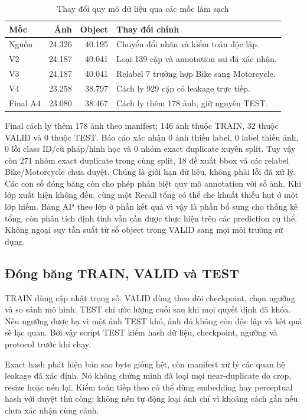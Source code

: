\documentclass[12pt,a4paper,oneside]{report}
\begin{document}
\begin{table}[H]\centering
\caption{Thay đổi quy mô dữ liệu qua các mốc làm sạch}\label{tab:cleaning}
\begin{tabular}{lrrp{6.1cm}}\toprule
Mốc & Ảnh & Object & Thay đổi chính\\\midrule
Nguồn & 24.326 & 40.195 & Chuyển đổi nhãn và kiểm toán độc lập.\\
V2 & 24.187 & 40.041 & Loại 139 cặp và annotation sai đã xác nhận.\\
V3 & 24.187 & 40.041 & Relabel 7 trường hợp Bike sang Motorcycle.\\
V4 & 23.258 & 38.797 & Cách ly 929 cặp có leakage trực tiếp.\\
Final A4 & 23.080 & 38.467 & Cách ly thêm 178 ảnh, giữ nguyên TEST.\\\bottomrule
\end{tabular}
\end{table}

Final cách ly thêm 178 ảnh theo manifest; 146 ảnh thuộc TRAIN, 32 thuộc VALID và 0 thuộc TEST. Báo cáo xác nhận 0 ảnh thiếu label, 0 label thiếu ảnh, 0 lỗi class ID/cú pháp/hình học và 0 nhóm exact duplicate xuyên split. Tuy vậy còn 271 nhóm exact duplicate trong cùng split, 18 đề xuất bbox và các relabel Bike/Motorcycle chưa duyệt. Chúng là giới hạn dữ liệu, không phải lỗi đã xử lý.
Các con số đóng băng còn cho phép phân biệt quy mô annotation với số ảnh. Khi lớp xuất hiện không đều, cùng một Recall tổng có thể che khuất thiếu hụt ở một lớp hiếm. Bảng AP theo lớp ở phần kết quả vì vậy là phần bổ sung cho thống kê tổng, còn phân tích định tính vẫn cần được thực hiện trên các prediction cụ thể. Không ngoại suy tần suất từ số object trong VALID sang mọi môi trường sử dụng.

\subsection{Đóng băng TRAIN, VALID và TEST}
TRAIN dùng cập nhật trọng số. VALID dùng theo dõi checkpoint, chọn ngưỡng và so sánh mô hình. TEST chỉ ước lượng cuối sau khi mọi quyết định đã khóa. Nếu ngưỡng được hạ vì một ảnh TEST khó, ảnh đó không còn độc lập và kết quả sẽ lạc quan. Bởi vậy script TEST kiểm hash dữ liệu, checkpoint, ngưỡng và protocol trước khi chạy.

Exact hash phát hiện bản sao byte giống hệt, còn manifest xử lý các quan hệ leakage đã xác định. Nó không chứng minh đã loại mọi near-duplicate do crop, resize hoặc nén lại. Kiểm toán tiếp theo có thể dùng embedding hay perceptual hash với duyệt thủ công; không nên tự động loại ảnh chỉ vì khoảng cách gần nếu chưa xác nhận cùng cảnh.
\end{document}
